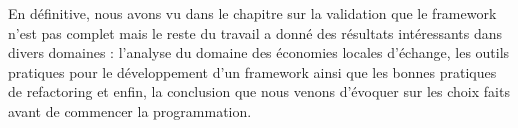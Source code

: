 En définitive,  nous avons vu dans le chapitre sur la validation que le framework n'est pas complet mais le reste du travail a donné des résultats intéressants dans divers domaines : l'analyse du  domaine des économies locales d'échange,  les outils pratiques pour le développement d'un framework ainsi que les bonnes pratiques de refactoring et enfin,  la conclusion que nous venons d'évoquer sur les choix faits avant de commencer la programmation.  